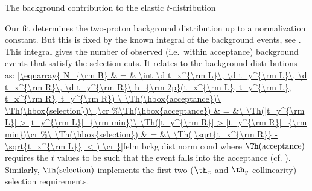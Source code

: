 
\caption{The background contribution to the elastic $t$-distribution}

Our fit  determines the two-proton background distribution  up to a normalization constant. But this is fixed by the known integral of the background events, see . This integral gives the number of observed (i.e.~within acceptance) background events that satisfy the selection cuts. It relates to the background distributions as:
\eqref{\eqnarray{
N_{\rm B} & = & \int \d t_x^{\rm L}\, \d t_y^{\rm L}\, \d t_x^{\rm R}\, \d t_y^{\rm R}\ h_{\rm 2p}(t_x^{\rm L}, t_y^{\rm L}, t_x^{\rm R}, t_y^{\rm R})
	\ \Th(\hbox{acceptance})\ \Th(\hbox{selection})\ ,\cr
}}{felm bckg dist norm cond}
where $\Th(\hbox{acceptance})$ requires the $t$ values to be such that the event falls into the acceptance (cf. ). Similarly, $\Th(\hbox{selection})$ implements the first two ($\th_x$ and $\th_y$ collinearity) selection requirements.

